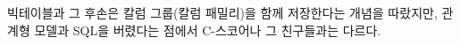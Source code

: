 \documentclass[twocolumn]{article}
\begin{document}
빅테이블과 그 후손은 칼럼 그룹(칼럼 패밀리)을 함께 저장한다는 개념을 따랐지만, 관계형 모델과 SQL을 버렸다는 점에서 C-스코어나 그 친구들과는 다르다. 

%
\end{document}
